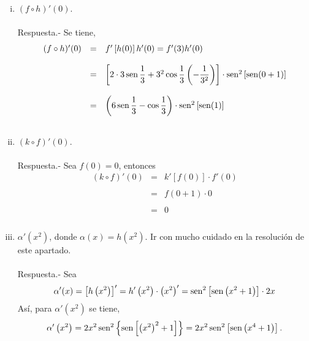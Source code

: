 \begin{enumerate}[\bfseries 1.]
	\begin{enumerate}[(i)]

	    \item $(f\circ h)'(0)$.\\\\
		Respuesta.-\; Se tiene,
		$$\begin{array}{rcl}
		    (f\circ h)'(0)&=&f'\left[h(0)\right]h'(0) = f'(3)h'(0)\\\\
				  &=& \left[2\cdot 3\mathop{\mbox{\normalfont sen}}\nolimits \dfrac{1}{3}+3^2\cos \dfrac{1}{3}\left(-\dfrac{1}{3^2}\right)\right]\cdot \mathop{\mbox{\normalfont sen}}\nolimits^2\left[\mathop{\mbox{\normalfont sen}}\nolimits(0+1)\right]\\\\
				  &=&\left(6\mathop{\mbox{\normalfont sen}}\nolimits \dfrac{1}{3}-\cos \dfrac{1}{3}\right)\cdot \mathop{\mbox{\normalfont sen}}\nolimits^2\left[\mathop{\mbox{\normalfont sen}}\nolimits(1)\right]\\\\
		\end{array}$$
		\vspace{.7cm}

	    \item $(k\circ f)'(0)$.\\\\
		Respuesta.-\; Sea $f(0)=0$, entonces
		$$\begin{array}{rcl}
		    (k\circ f)'(0)&=&k'\left[f(0)\right]\cdot f'(0)\\\\
				  &=&f(0+1)\cdot 0\\\\
				  &=&0\\\\
		\end{array}$$
		\vspace{.7cm}


	    \item $\alpha'\left(x^2\right)$, donde $\alpha(x)=h\left(x^2\right)$. Ir con mucho cuidado en la resolución de este apartado.\\\\
		Respuesta.-\; Sea 
		$$\alpha'(x)=\left[h\left(x^2\right)\right]' = h'\left(x^2\right)\cdot \left(x^2\right)' = \mathop{\mbox{\normalfont sen}}\nolimits^2\left[\mathop{\mbox{\normalfont sen}}\nolimits\left(x^2+1\right)\right]\cdot 2x$$
		Así, para $\alpha'\left(x^2\right)$ se tiene,
		$$\alpha'\left(x^2\right)=2x^2\mathop{\mbox{\normalfont sen}}\nolimits^2\left\{\mathop{\mbox{\normalfont sen}}\nolimits\left[\left(x^2\right)^2+1\right]\right\}=2x^2 \mathop{\mbox{\normalfont sen}}\nolimits^2\left[\mathop{\mbox{\normalfont sen}}\nolimits\left(x^4+1\right)\right].$$\\

	\end{enumerate}


\end{enumerate}
